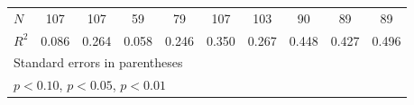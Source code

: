 {\begin{tabular}{l*{9}{c}}
\hline
\(N\)       &         107         &         107         &          59         &          79         &         107         &         103         &          90         &          89         &          89         \\
\(R^{2}\)   &       0.086         &       0.264         &       0.058         &       0.246         &       0.350         &       0.267         &       0.448         &       0.427         &       0.496         \\
\hline\hline
\multicolumn{10}{l}{\footnotesize Standard errors in parentheses}\\
\multicolumn{10}{l}{\footnotesize \sym{*} \(p<0.10\), \sym{**} \(p<0.05\), \sym{***} \(p<0.01\)}\\
\end{tabular}
}
